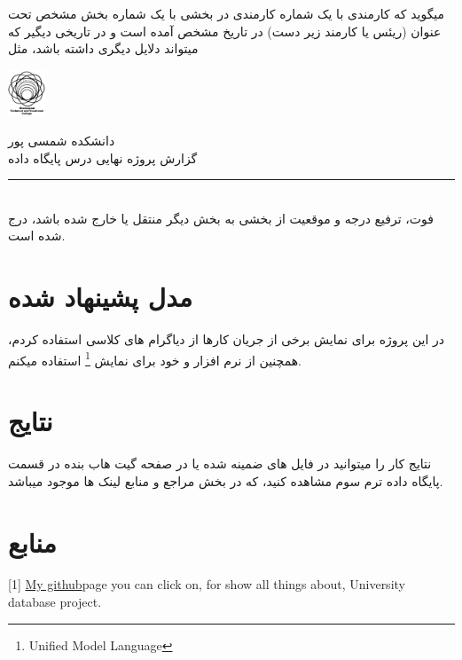 \documentclass{article}
\begin{document}
میگوید که کارمندی با یک شماره کارمندی در بخشی با یک شماره بخش مشخص تحت عنوان
(ریئس یا کارمند زیر دست)
در تاریخ مشخص آمده است و در تاریخی دیگیر که میتواند دلایل دیگری داشته باشد، مثل
\\
\hfill \break 
\begin{minipage}{0.1\textwidth}%
  \includegraphics[width=1.1cm]{tvu.png}
  \end{minipage}%
  \hfill%
  \begin{minipage}{0.9\textwidth}\raggedleft
  دانشکده شمسی پور\\
  گزارش پروژه نهایی درس پایگاه داده\\
  \end{minipage}

\par\noindent\rule{\textwidth}{3pt}\\

فوت، ترفیع درجه و موقعیت از بخشی به بخش دیگر منتقل یا خارج شده باشد، درج شده است.






\section{مدل پشینهاد شده}
در این پروژه برای نمایش برخی از جریان کارها از دیاگرام های کلاسی استفاده کردم، 
همچنین از نرم افزار
و خود
برای نمایش 
\footnote{Unified Model Language}
استفاده میکنم.

\section{نتایج}
نتایج کار را میتوانید در فایل های ضمینه شده یا در صفحه گیت هاب بنده در قسمت پایگاه داده ترم سوم مشاهده کنید، که در بخش مراجع و منابع لینک ها موجود میباشد.



\newpage
\section*{منابع}

\medskip

\small
\LTR 
\latin

[1] \href{https://github.com/Asncodes-80/handouting_hws/tree/main/Database%26az/Term3/prictice/final_project/universityProject}{My github}page you can click on, for show all things about, University database project.
\end{document}
